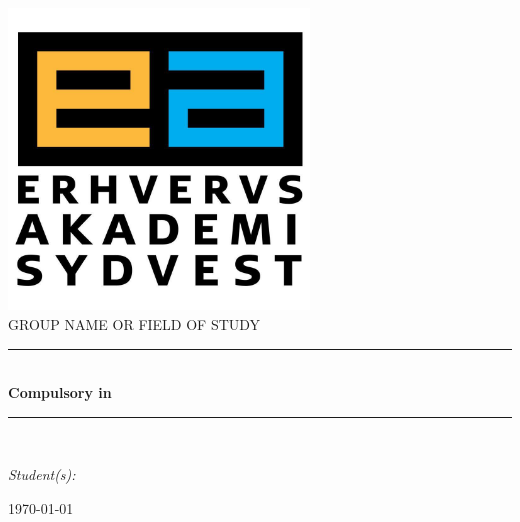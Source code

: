 \newcommand{\HRule}{\rule{\linewidth}{0.5 mm}}
\begin{titlepage}

\begin{center}
\includegraphics[width=0.6\textwidth]{images/easv.jpg}\\[0.5cm]

\textsc{\Large GROUP NAME OR FIELD OF STUDY %
	}\\[0.6cm]

\HRule \\[0.9cm]
{ \Huge \bfseries Compulsory in %
	}\\[0.4cm]

\HRule \\[0.5cm]

\end{center}


\emph{Student(s):}\\

\vfill

{\large \today}





\end{titlepage}